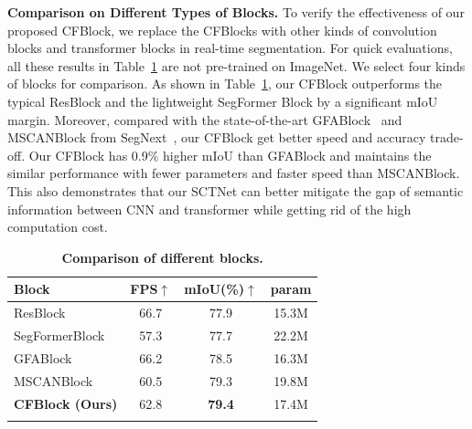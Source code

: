 \documentclass[letterpaper]{article} %
\begin{document}
\noindent
{\bf Comparison on Different Types of Blocks.} To verify the effectiveness of our proposed CFBlock, we replace the CFBlocks with other kinds of convolution blocks and transformer blocks in real-time segmentation. For quick evaluations, all these results in Table~\ref{tab:Block Ablation} are not pre-trained on ImageNet. We select four kinds of blocks for comparison. As shown in Table~\ref{tab:Block Ablation}, our CFBlock outperforms the typical ResBlock and the lightweight SegFormer Block by a significant mIoU margin. Moreover, compared with the state-of-the-art GFABlock~\cite{wang2022rtformer} and MSCANBlock from SegNext~\cite{guo2022segnext}, our CFBlock get better speed and accuracy trade-off. Our CFBlock has 0.9\% higher mIoU than GFABlock and maintains the similar performance with fewer parameters and faster speed than MSCANBlock. This also demonstrates that our SCTNet can better mitigate the gap of semantic information between CNN and transformer while getting rid of the high computation cost.
\begin{table}
	\begin{center}
        \setlength{\tabcolsep}{1mm}
        \centering
        \begin{tabular}{l|c|c|c}
        \Xhline{1pt}
            Block
            &FPS$\uparrow$
            &mIoU(\%)$\uparrow$
            &param\\
            \hline
            ResBlock &66.7 &77.9 &15.3M\\
            SegFormerBlock &57.3 &77.7 &22.2M\\
            GFABlock &66.2 &78.5 &16.3M\\
            MSCANBlock &60.5    &79.3 &19.8M    \\
            \textbf{CFBlock (Ours)} &62.8 &\textbf{79.4} &17.4M\\
        \Xhline{1pt}
        \end{tabular}
      \end{center}
      \caption{\textbf{Comparison of different blocks.}}
         \label{tab:Block Ablation}
\end{table}
\end{document}
